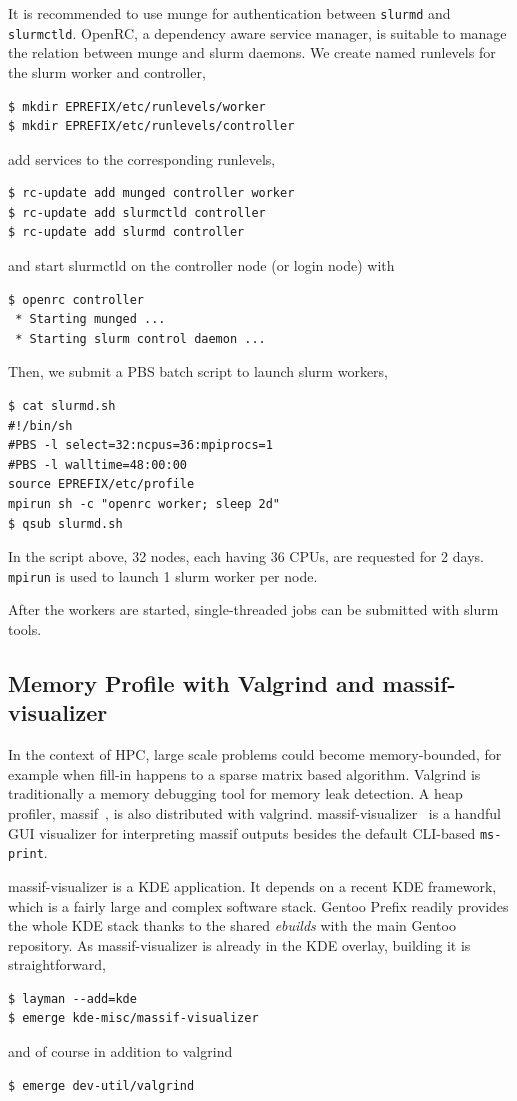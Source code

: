 \documentclass[a4paper,conference]{IEEEtran}
\begin{document}
It is recommended to use munge for authentication between
\texttt{slurmd} and \texttt{slurmctld}. OpenRC, a dependency aware
service manager, is suitable to manage the relation between munge and
slurm daemons. We create named runlevels for the slurm worker and controller,
\begin{verbatim}
$ mkdir EPREFIX/etc/runlevels/worker
$ mkdir EPREFIX/etc/runlevels/controller
\end{verbatim}
add services to the corresponding runlevels,
\begin{verbatim}
$ rc-update add munged controller worker
$ rc-update add slurmctld controller
$ rc-update add slurmd controller
\end{verbatim}
and start slurmctld on the controller node (or login node) with
\begin{verbatim}
$ openrc controller
 * Starting munged ...
 * Starting slurm control daemon ...
\end{verbatim}
Then, we submit a PBS batch script to launch slurm workers,
\begin{verbatim}
$ cat slurmd.sh
#!/bin/sh
#PBS -l select=32:ncpus=36:mpiprocs=1
#PBS -l walltime=48:00:00
source EPREFIX/etc/profile
mpirun sh -c "openrc worker; sleep 2d"
$ qsub slurmd.sh
\end{verbatim}
In the script above, 32 nodes, each having 36 CPUs, are requested for 2
days. \texttt{mpirun} is used to launch 1 slurm worker per node.

After the workers are started, single-threaded jobs can be submitted
with slurm tools.

\subsection{Memory Profile with Valgrind and massif-visualizer}
\label{sec:massif}
In the context of HPC, large scale problems could become
memory-bounded, for example when fill-in happens to a sparse matrix
based algorithm. Valgrind is traditionally a memory debugging tool
for memory leak detection. A heap profiler, massif~\cite{massif}, is
also distributed with valgrind.
massif-visualizer~\cite{massif:visualizer} is a handful GUI visualizer
for interpreting massif outputs besides the default CLI-based
\texttt{ms-print}.

massif-visualizer is a KDE application. It depends on a recent KDE
framework, which is a fairly large and complex software stack. Gentoo
Prefix readily provides the whole KDE stack thanks to the shared
\textit{ebuilds} with the main Gentoo repository. As massif-visualizer
is already in the KDE overlay, building it is straightforward,
\begin{verbatim}
$ layman --add=kde
$ emerge kde-misc/massif-visualizer
\end{verbatim}
and of course in addition to valgrind
\begin{verbatim}
$ emerge dev-util/valgrind
\end{verbatim}
\end{document}
